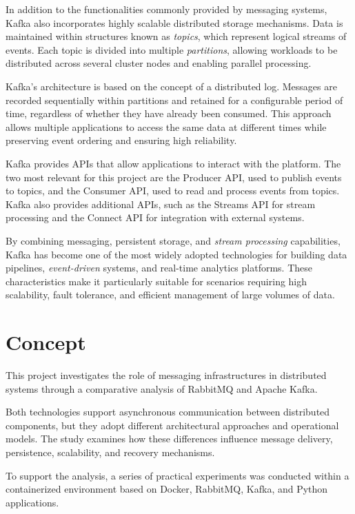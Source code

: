 \documentclass{scrartcl}
\begin{document}
In addition to the functionalities commonly provided by messaging systems, Kafka also incorporates highly scalable distributed storage mechanisms. Data is maintained within structures known as \textit{topics}, which represent logical streams of events. Each topic is divided into multiple \textit{partitions}, allowing workloads to be distributed across several cluster nodes and enabling parallel processing.

Kafka's architecture is based on the concept of a distributed log. Messages are recorded sequentially within partitions and retained for a configurable period of time, regardless of whether they have already been consumed. This approach allows multiple applications to access the same data at different times while preserving event ordering and ensuring high reliability.

Kafka provides APIs that allow applications to interact with the platform.
The two most relevant for this project are the Producer API, used to publish
events to topics, and the Consumer API, used to read and process events from
topics. Kafka also provides additional APIs, such as the Streams API for stream
processing and the Connect API for integration with external systems.

By combining messaging, persistent storage, and \textit{stream processing} capabilities, Kafka has become one of the most widely adopted technologies for building data pipelines, \textit{event-driven} systems, and real-time analytics platforms. These characteristics make it particularly suitable for scenarios requiring high scalability, fault tolerance, and efficient management of large volumes of data.


\section{Concept}\label{concept}

This project investigates the role of messaging infrastructures in distributed systems through a comparative analysis of RabbitMQ and Apache Kafka.

Both technologies support asynchronous communication between distributed components, but they adopt different architectural approaches and operational models. The study examines how these differences influence message delivery, persistence, scalability, and recovery mechanisms.

To support the analysis, a series of practical experiments was conducted within a containerized environment based on Docker, RabbitMQ, Kafka, and Python applications.
\end{document}
